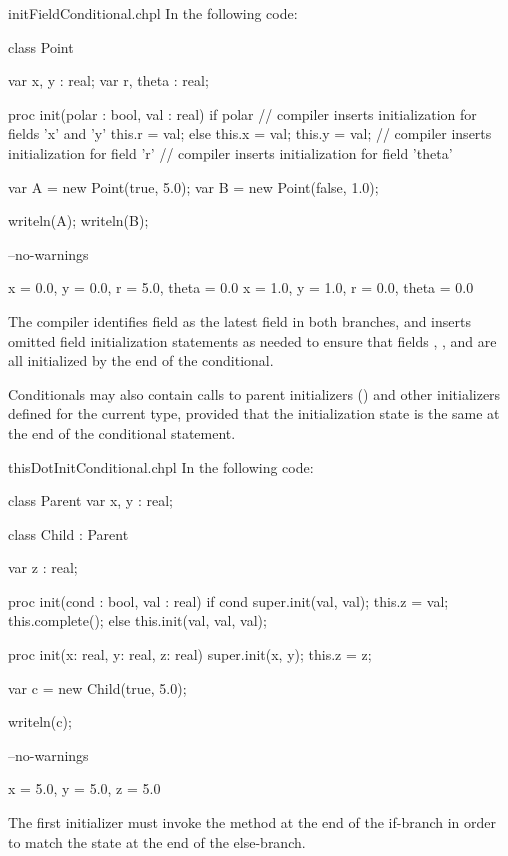 \begin{chapelexample}{initFieldConditional.chpl}
In the following code:
\begin{chapel}
class Point {
  var x, y : real;
  var r, theta : real;

  proc init(polar : bool, val : real) {
    if polar {
      // compiler inserts initialization for fields 'x' and 'y'
      this.r = val;
    } else {
      this.x = val;
      this.y = val;
      // compiler inserts initialization for field 'r'
    }
    // compiler inserts initialization for field 'theta'
  }
}

var A = new Point(true, 5.0);
var B = new Point(false, 1.0);
\end{chapel}
\begin{chapelpost}
writeln(A);
writeln(B);
\end{chapelpost}
\begin{chapelcompopts}
--no-warnings
\end{chapelcompopts}
\begin{chapeloutput}
{x = 0.0, y = 0.0, r = 5.0, theta = 0.0}
{x = 1.0, y = 1.0, r = 0.0, theta = 0.0}
\end{chapeloutput}

The compiler identifies field  as the latest field in both branches,
and inserts omitted field initialization statements as needed to ensure that
fields , , and  are all initialized by the end of the
conditional.
\end{chapelexample}

Conditionals may also contain calls to parent initializers
() and other initializers defined for the current
type, provided that the initialization state is the same at the end of the
conditional statement.

\begin{chapelexample}{thisDotInitConditional.chpl}
In the following code:
\begin{chapel}
class Parent {
  var x, y : real;
}

class Child : Parent {
  var z : real;

  proc init(cond : bool, val : real) {
    if cond {
      super.init(val, val);
      this.z = val;
      this.complete();
    } else {
      this.init(val, val, val);
    }
  }

  proc init(x: real, y: real, z: real) {
    super.init(x, y);
    this.z = z;
  }
}

var c = new Child(true, 5.0);
\end{chapel}
\begin{chapelpost}
writeln(c);
\end{chapelpost}
\begin{chapelcompopts}
--no-warnings
\end{chapelcompopts}
\begin{chapeloutput}
{x = 5.0, y = 5.0, z = 5.0}
\end{chapeloutput}
The first initializer must invoke the  method at the end of
the if-branch in order to match the state at the end of the else-branch.
\end{chapelexample}

